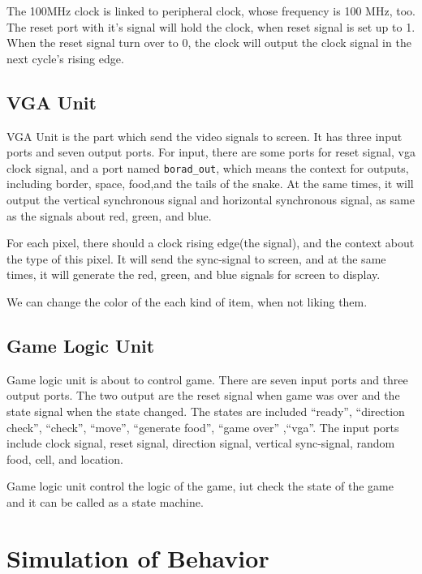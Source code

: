 \documentclass{article}
\begin{document}
    The 100MHz clock is linked to peripheral clock, whose frequency is 100 MHz, too.
    The reset port with it's signal will hold the clock, when reset signal is set up to 1.
    When the reset signal turn over to 0, the clock will output the clock signal in the next cycle's rising edge.
    
    \subsection{VGA Unit}
    \label{sec:vgaunit}
    
    VGA Unit is the part which send the video signals to screen. It has three input ports and seven output ports.
    For input, there are some ports for reset signal, vga clock signal, and a port named \verb|borad_out|,
    which means the context for outputs, including border, space, food,and the tails of the snake.
    At the same times, it will output the vertical synchronous signal and horizontal synchronous signal,
    as same as the signals about red, green, and blue.
    
    For each pixel, there should a clock rising edge(the signal), and the context about the type of this pixel.
    It will send the sync-signal to screen, and at the same times, it will generate the red, green, and blue signals for
    screen to display.
    
    We can change the color of the each kind of item, when not liking them.
     
     \subsection{Game Logic Unit}
     \label{sec:gamelogicunit}

     Game logic unit is about to control game. There are seven input ports and three output ports. 
     The two output are the reset signal when game was over and the state signal when the state changed.
     The states are included ``ready'', ``direction check'', ``check'', ``move'',
     ``generate food'', ``game over'' ,``vga''.
     The input ports include clock signal, reset signal, direction signal, vertical sync-signal,
     random food, cell, and location. 
    
    Game logic unit control the logic of the game, iut check the state of the game and it can 
    be called as a state machine.
    
    \section{Simulation of Behavior}
    \label{sec:presimulation}
    
\end{document}
